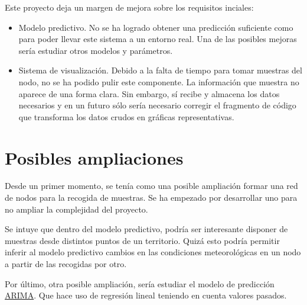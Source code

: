 Este proyecto deja un margen de mejora sobre los requisitos inciales:
\begin{itemize}
\item Modelo predictivo. No se ha logrado obtener una predicción suficiente como para poder llevar este sistema a un entorno real. Una de las posibles mejoras sería estudiar otros modelos y parámetros.

\item Sistema de visualización. Debido a la falta de tiempo para tomar muestras del nodo, no se ha podido pulir este componente. La información que muestra no aparece de una forma clara. Sin embargo, sí recibe y almacena los datos necesarios y en un futuro sólo sería necesario corregir el fragmento de código que transforma los datos crudos en gráficas representativas.
\end{itemize}

\section{Posibles ampliaciones}
Desde un primer momento, se tenía como una posible ampliación formar una red de nodos para la recogida de muestras. Se ha empezado por desarrollar uno para no ampliar la complejidad del proyecto.

Se intuye que dentro del modelo predictivo, podría ser interesante disponer de muestras desde distintos puntos de un territorio. Quizá esto podría permitir inferir al modelo predictivo cambios en las condiciones meteorológicas en un nodo a partir de las recogidas por otro.

Por último, otra posible ampliación, sería estudiar el modelo de predicción \href{https://www.analyticsvidhya.com/blog/2016/02/time-series-forecasting-codes-python/}{ARIMA}. Que hace uso de regresión lineal teniendo en cuenta valores pasados.
